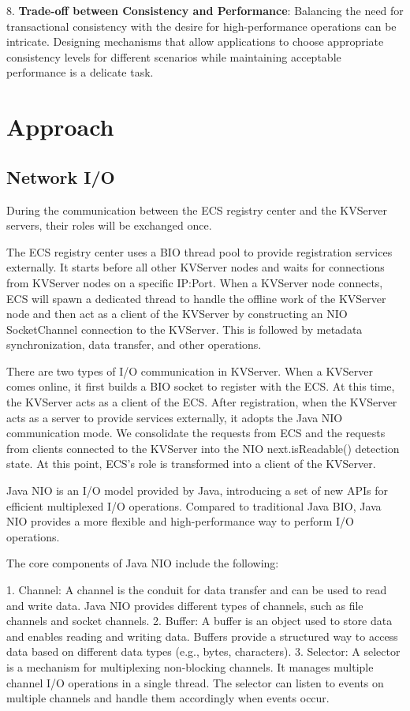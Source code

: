 \documentclass[sigconf]{acmart}
\begin{document}
8. \textbf{Trade-off between Consistency and Performance}: Balancing the need for transactional consistency with the desire for high-performance operations can be intricate. Designing mechanisms that allow applications to choose appropriate consistency levels for different scenarios while maintaining acceptable performance is a delicate task.
\section{Approach}

\subsection{Network I/O}

During the communication between the ECS registry center and the KVServer servers, their roles will be exchanged once.

The ECS registry center uses a BIO thread pool to provide registration services externally. It starts before all other KVServer nodes and waits for connections from KVServer nodes on a specific IP:Port. When a KVServer node connects, ECS will spawn a dedicated thread to handle the offline work of the KVServer node and then act as a client of the KVServer by constructing an NIO SocketChannel connection to the KVServer. This is followed by metadata synchronization, data transfer, and other operations.

There are two types of I/O communication in KVServer. When a KVServer comes online, it first builds a BIO socket to register with the ECS. At this time, the KVServer acts as a client of the ECS. After registration, when the KVServer acts as a server to provide services externally, it adopts the Java NIO communication mode. We consolidate the requests from ECS and the requests from clients connected to the KVServer into the NIO next.isReadable() detection state. At this point, ECS's role is transformed into a client of the KVServer.

Java NIO is an I/O model provided by Java, introducing a set of new APIs for efficient multiplexed I/O operations. Compared to traditional Java BIO, Java NIO provides a more flexible and high-performance way to perform I/O operations.

The core components of Java NIO include the following:

1. Channel: A channel is the conduit for data transfer and can be used to read and write data. Java NIO provides different types of channels, such as file channels and socket channels.
2. Buffer: A buffer is an object used to store data and enables reading and writing data. Buffers provide a structured way to access data based on different data types (e.g., bytes, characters).
3. Selector: A selector is a mechanism for multiplexing non-blocking channels. It manages multiple channel I/O operations in a single thread. The selector can listen to events on multiple channels and handle them accordingly when events occur.
\end{document}
